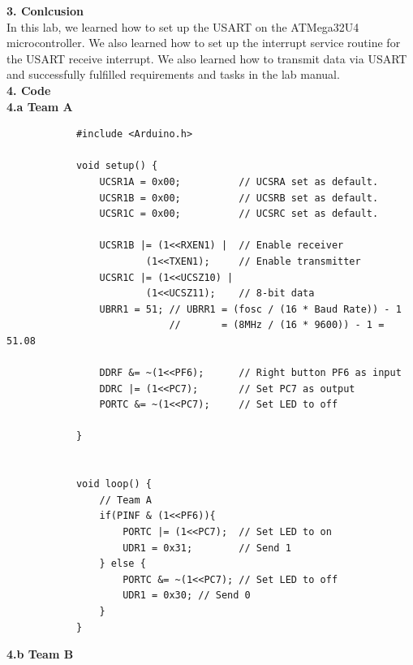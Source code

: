 \documentclass{report}
\begin{document}
{\Large \textbf{3. Conlcusion}}\\[0.5em]
    In this lab, we learned how to set up the USART on the ATMega32U4 microcontroller. We also learned how to set up the interrupt service routine for the USART receive interrupt. We also learned how to transmit data via USART and successfully fulfilled requirements and tasks in the lab manual. \\[1em]
{\Large \textbf{4. Code}}\\[0.5em]
{\Large \textbf{4.a Team A}}
\begin{verbatim}
            #include <Arduino.h>

            void setup() {
                UCSR1A = 0x00;          // UCSRA set as default. 
                UCSR1B = 0x00;          // UCSRB set as default.
                UCSR1C = 0x00;          // UCSRC set as default.

                UCSR1B |= (1<<RXEN1) |  // Enable receiver
                        (1<<TXEN1);     // Enable transmitter
                UCSR1C |= (1<<UCSZ10) |
                        (1<<UCSZ11);    // 8-bit data
                UBRR1 = 51; // UBRR1 = (fosc / (16 * Baud Rate)) - 1
                            //       = (8MHz / (16 * 9600)) - 1 = 51.08

                DDRF &= ~(1<<PF6);      // Right button PF6 as input
                DDRC |= (1<<PC7);       // Set PC7 as output
                PORTC &= ~(1<<PC7);     // Set LED to off

            }


            void loop() {
                // Team A
                if(PINF & (1<<PF6)){
                    PORTC |= (1<<PC7);  // Set LED to on
                    UDR1 = 0x31;        // Send 1
                } else {
                    PORTC &= ~(1<<PC7); // Set LED to off
                    UDR1 = 0x30; // Send 0
                }
            }
\end{verbatim}
{\Large \textbf{4.b Team B}}
\end{document}
